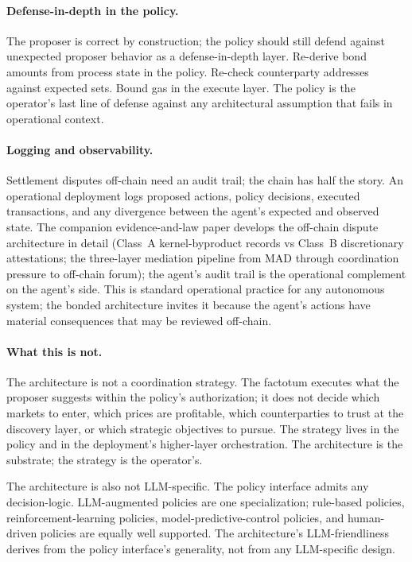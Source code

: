 \documentclass[11pt,a4paper]{article}
\theoremstyle{definition}
\theoremstyle{remark}
\begin{document}
\paragraph{Defense-in-depth in the policy.}
The proposer is correct by construction; the policy should still
defend against unexpected proposer behavior as a defense-in-depth
layer. Re-derive bond amounts from process state in the policy. Re-check
counterparty addresses against expected sets. Bound gas in the
execute layer. The policy is the operator's last line of defense
against any architectural assumption that fails in operational
context.

\paragraph{Logging and observability.}
Settlement disputes off-chain need an audit trail; the chain has
half the story. An operational deployment logs proposed actions,
policy decisions, executed transactions, and any divergence between
the agent's expected and observed state. The companion
evidence-and-law paper develops the off-chain dispute architecture
in detail (Class~A kernel-byproduct records vs Class~B discretionary
attestations; the three-layer mediation pipeline from MAD through
coordination pressure to off-chain forum); the agent's audit trail
is the operational complement on the agent's side. This is
standard operational practice for any autonomous system; the
bonded architecture invites it because the agent's actions have
material consequences that may be reviewed off-chain.

\paragraph{What this is not.}
The architecture is not a coordination strategy. The factotum
executes what the proposer suggests within the policy's authorization;
it does not decide which markets to enter, which prices are
profitable, which counterparties to trust at the discovery layer,
or which strategic objectives to pursue. The strategy lives in
the policy and in the deployment's higher-layer orchestration. The
architecture is the substrate; the strategy is the operator's.

The architecture is also not LLM-specific. The policy interface
admits any decision-logic. LLM-augmented policies are one
specialization; rule-based policies, reinforcement-learning
policies, model-predictive-control policies, and human-driven
policies are equally well supported. The architecture's
LLM-friendliness derives from the policy interface's generality,
not from any LLM-specific design.
\end{document}
